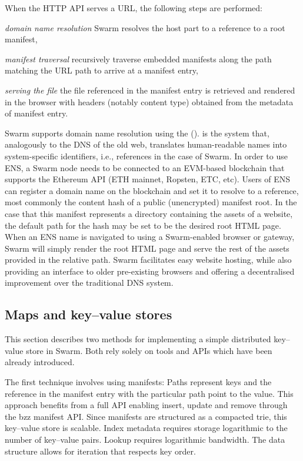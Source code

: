 When the HTTP API serves a URL, the following steps are performed:

\begin{labelledlist}
    \item[\emph{domain name resolution}] Swarm resolves the host part to a reference to a root manifest,
    \item[\emph{manifest traversal}] recursively traverse embedded manifests along the path matching the URL path to arrive at a manifest entry,
    \item[\emph{serving the file}] the file referenced in the manifest entry is retrieved and rendered in the browser with headers (notably content type) obtained from  the metadata of manifest entry.
\end{labelledlist}

Swarm supports domain name resolution using the  ().  is the system that, analogously to the DNS of the old web, translates human-readable names into system-specific identifiers, i.e., references in the case of Swarm.
%
In order to use ENS, a Swarm node needs to be connected to an EVM-based blockchain that supports the Ethereum API (ETH mainnet, Ropsten, ETC, etc). 
Users of ENS can register a domain name on the blockchain and set it to resolve to a reference, most commonly the content hash of a public (unencrypted) manifest root. In the case that this manifest represents a directory containing the assets of a website, the default path for the hash may be set to be the desired root HTML page. When an ENS name is navigated to using a Swarm-enabled browser or gateway, Swarm will simply render the root HTML page and serve the rest of the assets provided in the relative path. Swarm facilitates easy website hosting, while also providing an interface to older pre-existing browsers and offering a decentralised improvement over the traditional DNS system.


\subsection{Maps and key--value stores\statusgreen}\label{sec:maps}

This section describes two methods for implementing a simple distributed key--value store in Swarm. Both rely solely on tools and APIs which have been already introduced.

The first technique involves using manifests: Paths represent keys and the reference in the manifest entry with the particular path point to the value. This approach benefits from a full API enabling insert, update and remove through the bzz manifest API. Since manifests are structured as a compacted trie, this key--value store is scalable. Index metadata requires storage logarithmic to the number of key--value pairs. Lookup requires logarithmic bandwidth. The data structure allows for iteration that respects key order. 

